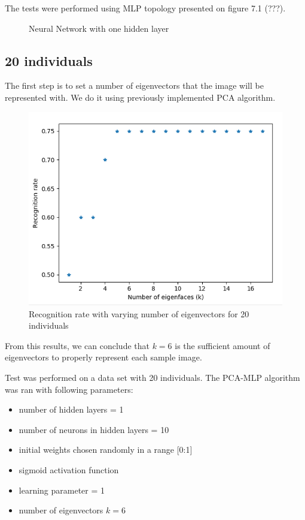 The tests were performed using MLP topology presented on figure 7.1 (???).

\begin{figure}[!h]
\centering

\caption{Neural Network with one hidden layer}
\end{figure}


\subsection{20 individuals}

The first step is to set a number of eigenvectors that the image will be represented with. We do it using previously implemented PCA algorithm. 

\begin{figure}[H]
\centering
\includegraphics[scale=0.7]{img/tests/20ppl/PCA_on_20ppl_vs_k.png}
\caption{Recognition rate with varying number of eigenvectors for 20 individuals}
\end{figure} 

From this results, we can conclude that $k = 6$ is the sufficient amount of eigenvectors to properly represent each sample image. 

Test was performed on a data set with 20 individuals.
The PCA-MLP algorithm was ran with following parameters:

\begin{itemize}
\itemsep0em 
\item number of hidden layers = 1
\item number of neurons in hidden layers = 10
\item initial weights chosen randomly in a range [0:1]
\item sigmoid activation function
\item learning parameter = 1
\item number of eigenvectors $k = 6$
\end{itemize}

